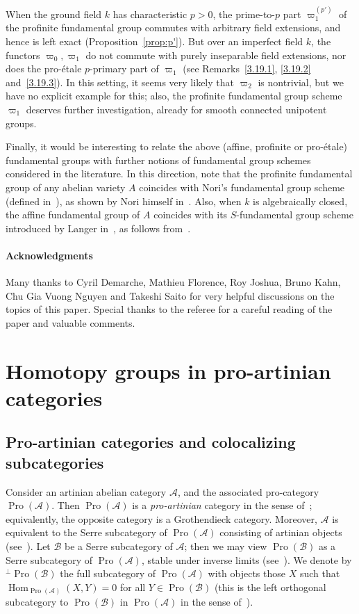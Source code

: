 \documentclass[11pt]{article}
\theoremstyle{definition}
\numberwithin{equation}{section}
\newcommand\cA{{\mathcal A}}
\newcommand\cB{{\mathcal B}}
\DeclareMathOperator{\Hom}{Hom}
\DeclareMathOperator{\Pro}{Pro}
\theoremstyle{remark}
\begin{document}
When the ground field $k$ has characteristic $p > 0$, the prime-to-$p$ part $\varpi_1^{(p')}$ of the profinite fundamental group commutes with arbitrary field extensions, and hence is left exact (Proposition~\ref{prop:p'}). But over an imperfect field $k$, the functors $\varpi_0,\varpi_1$ do not commute with purely inseparable field extensions, nor does the pro-\'etale $p$-primary part of $\varpi_1$ (see Remarks~\ref{3.19.1}, \ref{3.19.2} and~\ref{3.19.3}). In this setting, it seems very likely that $\varpi_2$ is nontrivial, but we have no explicit example for this; also, the profinite fundamental group scheme $\varpi_1$ deserves further investigation, already for smooth connected unipotent groups.

Finally, it would be interesting to relate the above (affine, profinite or pro-\'etale) fundamental groups with further notions of fundamental group schemes considered in the literature. In this direction, note that the profinite fundamental group of any abelian variety $A$ coincides with Nori's fundamental group scheme (defined in~\cite{No76, No82}), as shown by Nori himself in~\cite{No83}. Also, when $k$ is algebraically closed, the affine fundamental group of $A$ coincides with its $S$-fundamental group scheme introduced by Langer in~\cite{La11}, as follows from~\cite[Thm.~6.1]{La12}.

\paragraph{Acknowledgments}
Many thanks to Cyril Demarche, Mathieu Florence, Roy Joshua, Bruno Kahn, Chu Gia Vuong Nguyen and Takeshi Saito for very helpful discussions on the topics of this paper. Special thanks to the referee for a careful reading of the paper and valuable comments.


\section{Homotopy groups in pro-artinian categories}\label{sec:homotopy}

\subsection{Pro-artinian categories and colocalizing subcategories}\label{subsec:pro-artinian}

Consider an artinian abelian category $\cA$, and the associated pro-category $\Pro(\cA)$. Then $\Pro(\cA)$ is a \emph{pro-artinian} category in the sense of~\cite[V.2.2]{DG}; equivalently, the opposite category is a Grothendieck category. Moreover, $\cA$ is equivalent to the Serre subcategory of $\Pro(\cA)$ consisting of artinian objects (see~\cite[V.2.3.1]{DG}). Let $\cB$ be a Serre subcategory of $\cA$; then we may view $\Pro(\cB)$ as a Serre subcategory of $\Pro(\cA)$, stable under inverse limits (see~\cite[Lem.~2.11]{Br17b}). We denote by ${^{\perp}\Pro(\cB)}$ the full subcategory of $\Pro(\cA)$ with objects those $X$ such that $\Hom_{\Pro(\cA)}(X,Y) = 0$ for all $Y \in \Pro(\cB)$ (this is the left orthogonal subcategory to $\Pro(\cB)$ in $\Pro(\cA)$ in the sense of~\cite[II.1]{BR}).
\end{document}
